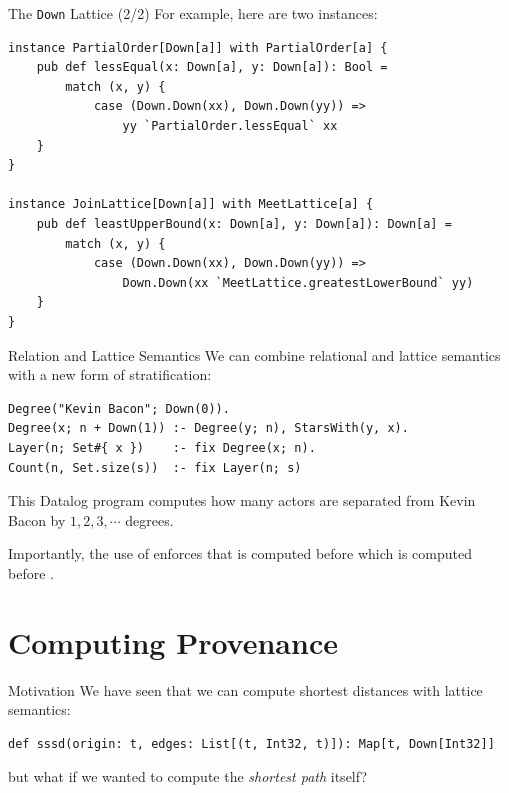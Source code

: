 \begin{frame}[fragile]{The \texttt{Down} Lattice (2/2)}
For example, here are two instances:

\begin{lstlisting}[language=flix, xleftmargin=0.5cm]
instance PartialOrder[Down[a]] with PartialOrder[a] {
    pub def lessEqual(x: Down[a], y: Down[a]): Bool = 
        match (x, y) {
            case (Down.Down(xx), Down.Down(yy)) => 
                yy `PartialOrder.lessEqual` xx
    }
}

instance JoinLattice[Down[a]] with MeetLattice[a] {
    pub def leastUpperBound(x: Down[a], y: Down[a]): Down[a] = 
        match (x, y) {
            case (Down.Down(xx), Down.Down(yy)) => 
                Down.Down(xx `MeetLattice.greatestLowerBound` yy)
    }
}
\end{lstlisting}
\end{frame}

\begin{frame}[fragile]{Relation and Lattice Semantics}
We can combine relational and lattice semantics with a new form of
stratification: 

\begin{lstlisting}[language=flix, xleftmargin=0.8cm]
Degree("Kevin Bacon"; Down(0)).
Degree(x; n + Down(1)) :- Degree(y; n), StarsWith(y, x).
Layer(n; Set#{ x })    :- fix Degree(x; n).
Count(n, Set.size(s))  :- fix Layer(n; s)
\end{lstlisting}

\pause

This Datalog program computes how many actors are separated from Kevin Bacon by
$1, 2, 3, \cdots$ degrees. 

\pause

Importantly, the use of  enforces that  is computed
before  which is computed before .
\end{frame}

\section{Computing Provenance}

\begin{frame}[fragile]{Motivation}
We have seen that we can compute shortest distances with lattice semantics: 

\begin{lstlisting}[language=flix, xleftmargin=0.8cm]
def sssd(origin: t, edges: List[(t, Int32, t)]): Map[t, Down[Int32]]
\end{lstlisting}

but what if we wanted to compute the \emph{shortest path} itself?
\end{frame}

